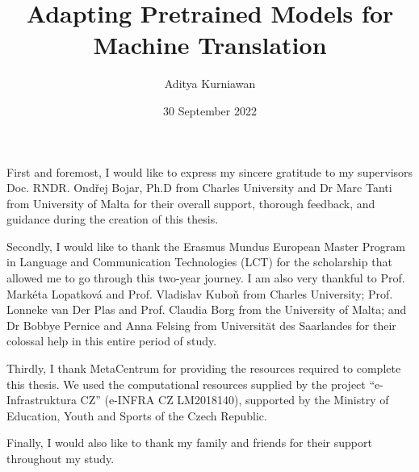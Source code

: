 \documentclass[12pt, a4paper]{report}
\theoremstyle{definition}
\theoremstyle{definition}%
\theoremstyle{definition}%
\theoremstyle{definition}%
\theoremstyle{definition}%
\theoremstyle{definition}%
\begin{document}
\title{Adapting Pretrained Models for Machine Translation}
\author{Aditya Kurniawan}
\date{30 September 2022}

\frontmatter


\begin{acknowledgements}
    First and foremost, I would like to express my sincere gratitude to my supervisors Doc. RNDR. Ondřej Bojar, Ph.D from Charles University and Dr Marc Tanti from University of Malta for their overall support, thorough feedback, and guidance during the creation of this thesis.

    Secondly, I would like to thank the Erasmus Mundus European Master Program in Language and Communication Technologies (LCT) for the scholarship that allowed me to go through this two-year journey. I am also very thankful to Prof. Markéta Lopatková and Prof. Vladislav Kuboň from Charles University; Prof. Lonneke van Der Plas and Prof. Claudia Borg from the University of Malta; and Dr Bobbye Pernice and Anna Felsing from Universität des Saarlandes for their colossal help in this entire period of study.

    Thirdly, I thank MetaCentrum for providing the resources required to complete this thesis. We used the computational resources supplied by the project ``e-Infrastruktura CZ'' (e-INFRA CZ LM2018140), supported by the Ministry of Education, Youth and Sports of the Czech Republic.

    Finally, I would also like to thank my family and friends for their support throughout my study.
\end{acknowledgements}
\end{document}
